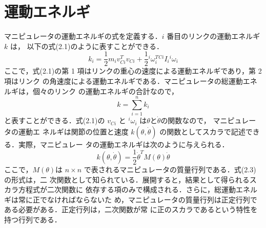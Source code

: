 
 \section{運動エネルギ}

マニピュレータの運動エネルギの式を定義する．$i$ 番目のリンクの運動エネルギ $k$ は，
以下の式(2.1)のように表すことができる．
\begin{equation}
     k_i= \frac{1}{2} m_i v_{Ci}^{T} v_{Ci} +\frac{1}{2} {}^{i}{\omega}_{i}^{T}  {}^{Ci} I_i {}^{i}{\omega}_i
\end{equation}
ここで，式(2.1)の第 1 項はリンクの重心の速度による運動エネルギであり，第 2 項はリンク
の角速度による運動エネルギである．マニピュレータの総運動エネルギは，個々のリンク
の運動エネルギの合計なので，
\begin{equation}
     k= \sum^{n}_{i=1}k_{i}
\end{equation}
と表すことができる．式(2.1)の $v_{Ci}$ と ${}^{i}{\omega}_{i}$ は$\theta$と$\dot{\theta}$の関数なので， マニピュレータの運動エ
ネルギは関節の位置と速度 $k(\theta,\dot{\theta})$ の関数としてスカラで記述できる．実際，マニピュレー
タの運動エネルギは次のように与えられる．
\begin{equation}
     k(\theta,\dot{\theta})= \frac{1}{2} \dot{\theta}^T M(\theta) \dot{\theta}
\end{equation}
ここで，$M(\theta)$は $n×n$ で表されるマニピュレータの質量行列である．式(2.3)の形式は，二
次関数として知られている．展開すると，結果として得られるスカラ方程式が二次関数に
依存する項のみで構成される．さらに，総運動エネルギは常に正でなければならないた
め，マニピュレータの質量行列は正定行列である必要がある．正定行列は，二次関数が常
に正のスカラであるという特性を持つ行列である．
\newpage
